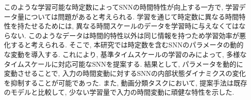このような学習可能な時定数によってSNNの時間特性が向上する一方で, 学習データ量については問題があると考えられる.
学習を通じて時定数に異なる時間特性を持たせるためには, 異なる時間スケールのデータを学習時に与えなくてはならない.
このようなデータは時間的特性以外は同じ情報を持つため学習効率が悪化すると考えられる.
そこで, 本研究では時定数を含むSNNのパラメータの動的な変動を導入する.
これにより, 基準タイムスケールの学習のみによって, 多様なタイムスケールに対応可能なSNNを提案する.
結果として, パラメータを動的に変動させることで, 入力の時間変動に対するSNNの内部状態ダイナミクスの変化を抑制することが可能であった.
また, 動画分類タスクにおいて, 提案手法は既存のモデルと比較して, 少ない学習量で入力の時間変動に頑健な特性を示した.

